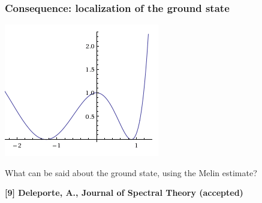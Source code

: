 \documentclass[mathserif]{beamer}
\begin{document}
\begin{frame}
  \frametitle{Consequence: localization of the ground state}
  \begin{minipage}[l]{0.3\linewidth}
    \includegraphics[width=\linewidth]{wells.png}
  \end{minipage}
  \begin{minipage}[r]{0.65\linewidth}
    What can be said about the ground state, using the Melin estimate?
    

  \end{minipage}

  \vspace{2em}

\small{{\bfseries [9] Deleporte, A., Journal of Spectral Theory
    (accepted)}}
\end{frame}
\end{document}
